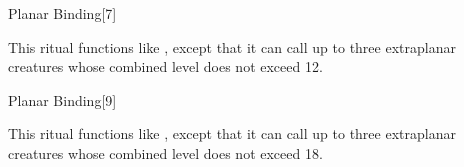 \begin{spellsection}{Planar Binding}[7]
    \begin{spellheader}
    \end{spellheader}
    \begin{spellcontent}
        \begin{spelltargetinginfo}
        \end{spelltargetinginfo}
        \begin{spelleffects}
            \spellspecial This ritual functions like , except that it can call up to three extraplanar creatures whose combined level does not exceed 12.
        \end{spelleffects}
    \end{spellcontent}
    \begin{spellfooter}
    \end{spellfooter}
\end{spellsection}

\begin{spellsection}[Greater]{Planar Binding}[9]
    \begin{spellheader}
    \end{spellheader}
    \begin{spellcontent}
        \begin{spelltargetinginfo}
        \end{spelltargetinginfo}
        \begin{spelleffects}

            \spellspecial This ritual functions like , except that it can call up to three extraplanar creatures whose combined level does not exceed 18.
        \end{spelleffects}
    \end{spellcontent}
    \begin{spellfooter}
    \end{spellfooter}
\end{spellsection}

